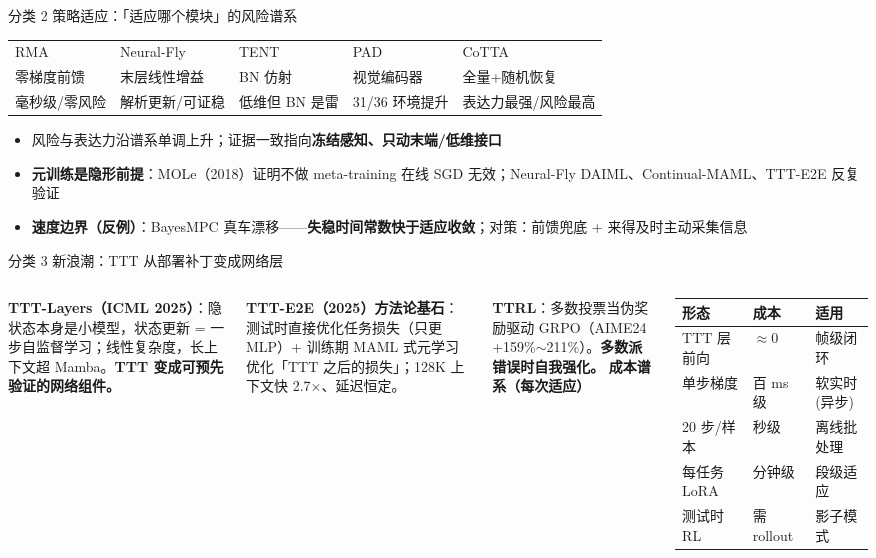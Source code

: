 \documentclass[10pt,aspectratio=169]{beamer}
\newcommand{\hl}[1]{\textcolor{good}{\textbf{#1}}}
\newcommand{\wa}[1]{\textcolor{warn}{\textbf{#1}}}
\begin{document}
\begin{frame}{分类 2 策略适应：「适应哪个模块」的风险谱系}
\centering
\small
\begin{tabular}{lllll}
\toprule
RMA & Neural-Fly & TENT & PAD & CoTTA\\
零梯度前馈 & 末层线性增益 & BN 仿射 & 视觉编码器 & 全量+随机恢复\\
毫秒级/零风险 & 解析更新/可证稳 & 低维但 BN 是雷 & 31/36 环境提升 & 表达力最强/风险最高\\
\bottomrule
\end{tabular}
\vspace{6pt}
\begin{itemize}
\item 风险与表达力沿谱系单调上升；证据一致指向\hl{冻结感知、只动末端/低维接口}
\item \textbf{元训练是隐形前提}：MOLe（2018）证明不做 meta-training 在线 SGD 无效；Neural-Fly DAIML、Continual-MAML、TTT-E2E 反复验证
\item \textbf{速度边界（反例）}：BayesMPC 真车漂移——\wa{失稳时间常数快于适应收敛}；对策：前馈兜底 + 来得及时主动采集信息
\end{itemize}
\end{frame}

\begin{frame}{分类 3 新浪潮：TTT 从部署补丁变成网络层}
\begin{columns}[T]
\textbf{TTT-Layers（ICML 2025）}：隐状态本身是小模型，状态更新 = 一步自监督学习；线性复杂度，长上下文超 Mamba。\hl{TTT 变成可预先验证的网络组件。}
\vspace{4pt}

\textbf{TTT-E2E（2025）方法论基石}：测试时直接优化任务损失（只更 MLP）+ 训练期 MAML 式元学习优化「TTT 之后的损失」；128K 上下文快 2.7$\times$、延迟恒定。
\vspace{4pt}

\textbf{TTRL}：多数投票当伪奖励驱动 GRPO（AIME24 +159\%$\sim$211\%）。\wa{多数派错误时自我强化。}
\textbf{成本谱系（每次适应）}
\small
\begin{tabular}{lll}
\toprule
形态 & 成本 & 适用\\
\midrule
TTT 层前向 & $\approx$0 & 帧级闭环\\
单步梯度 & 百 ms 级 & 软实时(异步)\\
20 步/样本 & 秒级 & 离线批处理\\
每任务 LoRA & 分钟级 & 段级适应\\
测试时 RL & 需 rollout & 影子模式\\
\bottomrule
\end{tabular}
\end{columns}
\end{frame}
\end{document}
